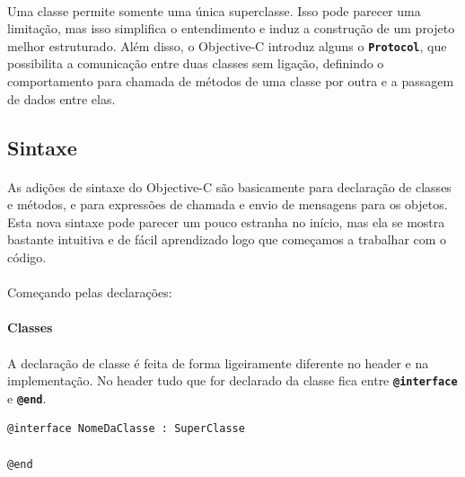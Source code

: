 \documentclass[a4paper,12pt,brazil,doubleside]{book}
\begin{document}
\paragraph{}Uma classe permite  somente uma única superclasse. Isso pode parecer uma limitação, mas isso simplifica o entendimento e induz a construção de um projeto melhor estruturado. Além disso, o Objective-C introduz alguns o \texttt{\textbf{Protocol}}, que possibilita a comunicação entre duas classes sem ligação, definindo o comportamento para chamada de métodos de uma classe por outra e a passagem de dados entre elas.

\bigskip 

\subsection{Sintaxe}

\paragraph{}As adições de sintaxe do Objective-C são basicamente para declaração de classes e métodos, e para expressões de chamada e envio de mensagens para os objetos. Esta nova sintaxe pode parecer um pouco estranha no início, mas ela se mostra bastante intuitiva e de fácil aprendizado logo que começamos a trabalhar com o código.
\paragraph{}Começando pelas declarações:

\bigskip 

\paragraph{}\textbf{Classes}

\paragraph{}A declaração de classe é feita de forma ligeiramente diferente no header e na implementação. No header tudo que for declarado da classe fica entre \texttt{\textbf{@interface}} e \texttt{\textbf{@end}}.

\begin{listing}
\begin{verbatim}
@interface NomeDaClasse : SuperClasse

@end
\end{verbatim}
\end{listing}
\end{document}
